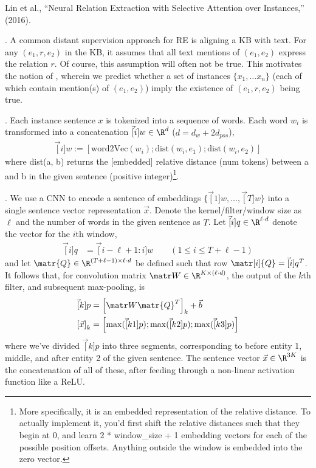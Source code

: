 \documentclass[11pt]{article}
\begin{document}
\vspace{-1em}
{\footnotesize Lin et al., ``Neural Relation Extraction with Selective Attention over Instances,'' (2016).}

\p {}. A common distant supervision approach for RE is aligning a KB with text. For any $(e_1, r, e_2)$ in the KB, it assumes that all text mentions of $(e_1, e_2)$ express the relation $r$. Of course, this assumption will often not be true. This motivates the notion of , wherein we predict whether a set of instances $\{x_1, \ldots x_n\}$ (each of which contain mention(s) of $(e_1, e_2)$) imply the existence of $(e_1, r, e_2)$ being true.

\myspace
\p {}. Each instance sentence $x$ is tokenized into a sequence of words. Each word $w_i$ is transformed into a concatenation $\vec[i]{w} \in \R^{d}$ ($d = d_w + 2 d_{pos}$), 
\begin{align}
\vec[i]{w} := [\text{word2Vec}(w_i); \text{dist}(w_i, e_1); \text{dist}(w_i, e_2)]
\end{align} 
where dist(a, b) returns the [embedded] relative distance (num tokens) between a and b in the given sentence (positive integer)\footnote{More specifically, it is an embedded representation of the relative distance. To actually implement it,  you'd first shift the relative distances such that they begin at 0, and learn 2 * window\_size + 1 embedding vectors for each of the possible position offsets. Anything outside the window is embedded into the zero vector.}.

\myspace
\p {}. We use a CNN to encode a sentence of embeddings $\{ \vec[1]{w}, \ldots, \vec[T]{w}  \}$ into a single sentence vector representation $\vec x$. Denote the kernel/filter/window size as $\ell$ and the number of words in the given sentence as $T$. Let $\vec[i]{q} \in \R^{\ell \cdot d}$ denote the vector for the $i$th window,
\begin{align}
\vec[i]{q} &= \vec[i-\ell+1:i]{w} \qquad (1 \le i \le T + \ell - 1)
\end{align}
and let $\matr{Q} \in \R^{(T + \ell - 1) \times \ell \cdot d}$ be defined such that row $\matr[i]{Q} = \vec[i]{q}^T$. 
It follows that, for convolution matrix $\matr W \in \R^{K \times (\ell \cdot d)}$, the output of the $k$th filter, and subsequent max-pooling, is
\begin{align}
\vec[k]{p} &= \left[ \matr W \matr{Q}^T \right]_k + \vec  b \\
\left[\vec x\right]_k &= \left[
\max(\vec[k1]{p});
\max(\vec[k2]{p});
\max(\vec[k3]{p})
\right]
\end{align}
where we've divided $\vec[k]{p}$ into three segments, corresponding to before entity 1, middle, and after entity 2 of the given sentence. The sentence vector $\vec x \in \R^{3K}$ is the concatenation of all of these, after feeding through a non-linear activation function like a ReLU. 
\end{document}
